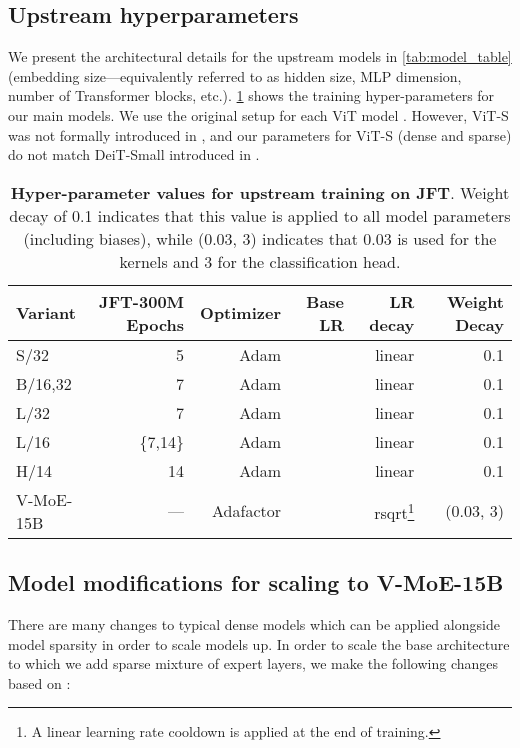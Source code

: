 \documentclass{article}
\newcommand{\abbv}{{V-MoE}}
\begin{document}
\subsection{Upstream hyperparameters}\label{sec:upstream_hparams}

We present the architectural details for the upstream models in \cref{tab:model_table} (embedding size---equivalently referred to as hidden size, MLP dimension, number of Transformer blocks, etc.).
\cref{tab:upstream_hparams} shows the training hyper-parameters for our main models.
We use the original setup for each ViT model \cite{dosovitskiy2020image}.
However, ViT-S was not formally introduced in \cite{dosovitskiy2020image}, and our parameters for ViT-S (dense and sparse) do not match DeiT-Small introduced in \cite{touvron2020deit}.


\begin{table}[tb]
\centering
\caption{
\textbf{Hyper-parameter values for upstream training on JFT}.
Weight decay of 0.1 indicates that this value is applied to all model parameters (including biases), 
while (0.03, 3) indicates that 0.03 is used for the kernels and 3 for the classification head.
\label{tab:upstream_hparams}}
\begin{tabular}{lrrrrr}
\toprule
Variant   & JFT-300M Epochs & Optimizer & Base LR & LR decay & Weight Decay\\
\midrule
S/32      & 5        & Adam      &  & linear & 0.1\\
B/{16,32} & 7        & Adam      &  & linear & 0.1\\
L/32      & 7        & Adam      &  & linear & 0.1\\  
L/16      & \{7,14\} & Adam      &  & linear & 0.1\\
H/14      & 14       & Adam      &  & linear & 0.1\\
V-MoE-15B & ---      & Adafactor &  & rsqrt\footnote{A linear learning rate cooldown is applied at the end of training.} & (0.03, 3)\\
\bottomrule     
\end{tabular}
\end{table}


\subsection{Model modifications for scaling to \abbv{}-15B}
\label{app:vitg_tricks}
There are many changes to typical dense models which can be applied alongside model sparsity in order to scale models up. In order to scale the base architecture to which we add sparse mixture of expert layers, we make the following changes based on \cite{zhai2021scaling}:
\end{document}
